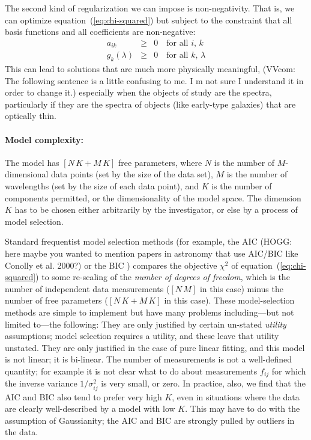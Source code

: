 \documentclass[12pt,preprint]{aastex}
\newcommand{\equationname}{equation}
\begin{document}
The second kind of regularization we can impose is non-negativity.
That is, we can optimize \equationname~(\ref{eq:chi-squared}) but subject
to the constraint that all basis functions and all coefficients are
non-negative:
\begin{eqnarray}\label{eq:non-negative}\displaystyle
a_{ik} & \geq & 0 \quad\mbox{for all $i$, $k$} \nonumber\\
g_{k}(\lambda) & \geq & 0 \quad\mbox{for all $k$, $\lambda$}
\end{eqnarray}
This can lead to solutions that are much more physically meaningful, 
(VVcom: The following sentence is a little confusing to me. 
I m not sure I understand it in order to change it.)
especially when the objects of study are the spectra, particularly if
they are the spectra of objects (like early-type galaxies) that are
optically thin.

\paragraph{Model complexity:}
The model has $[N\,K + M\,K]$ free parameters, where $N$ is the number
of $M$-dimensional data points (set by the size of the data set), $M$
is the number of wavelengths (set by the size of each data point), and
$K$ is the number of components permitted, or the dimensionality of
the model space.  The dimension $K$ has to be chosen either
arbitrarily by the investigator, or else by a process of model
selection.

Standard frequentist model selection methods (for example, the AIC
\citep{aic} (HOGG: here maybe you wanted to mention papers in 
astronomy that use AIC/BIC like Conolly et al. 2000?) or the BIC \citep{bic}) 
compares the objective $\chi^2$ of
\equationname~(\ref{eq:chi-squared}) to some re-scaling of the
\emph{number of degrees of freedom}, which is the number of independent
data measurements ($[N\,M]$ in this case) minus the number of free
parameters ($[N\,K + M\,K]$ in this case).  These model-selection
methods are simple to implement but have many problems
including---but not limited to---the following: They are only
justified by certain un-stated \emph{utility} assumptions; model
selection requires a utility, and these leave that utility unstated.
They are only justified in the case of pure linear fitting, and this
model is not linear; it is bi-linear.  The number of measurements is
not a well-defined quantity; for example it is not clear what to do
about measurements $f_{ij}$ for which the inverse variance
$1/\sigma^2_{ij}$ is very small, or zero.  In practice, also, we find
that the AIC and BIC also tend to prefer very high $K$, even in
situations where the data are clearly well-described by a model with
low $K$.  This may have to do with the assumption of Gaussianity; the
AIC and BIC are strongly pulled by outliers in the data.
\end{document}
